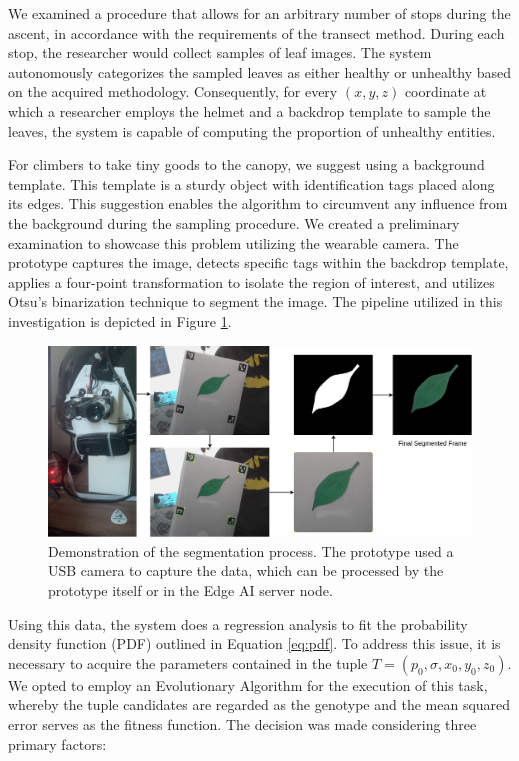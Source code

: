 We examined a procedure that allows for an arbitrary number of stops during the ascent, in accordance with the requirements of the transect method. During each stop, the researcher would collect samples of leaf images. The system autonomously categorizes the sampled leaves as either healthy or unhealthy based on the acquired methodology. Consequently, for every $(x,y,z)$ coordinate at which a researcher employs the helmet and a backdrop template to sample the leaves, the system is capable of computing the proportion of unhealthy entities. 

For climbers to take tiny goods to the canopy, we suggest using a background template. This template is a sturdy object with identification tags placed along its edges. This suggestion enables the algorithm to circumvent any influence from the background during the sampling procedure. We created a preliminary examination to showcase this problem utilizing the wearable camera. The prototype captures the image, detects specific tags within the backdrop template, applies a four-point transformation to isolate the region of interest, and utilizes Otsu's binarization technique to segment the image. The pipeline utilized in this investigation is depicted in Figure \ref{fig:segmentation}.

\begin{figure}[h!]
    \centering
    \includegraphics[width = .9\linewidth]{Figures/segmentation.png}
    \caption{Demonstration of the segmentation process. The prototype used a USB camera to capture the data, which can be processed by the prototype itself or in the Edge AI server node.}
    \label{fig:segmentation}
\end{figure}

Using this data, the system does a regression analysis to fit the probability density function (PDF) outlined in Equation \ref{eq:pdf}. To address this issue, it is necessary to acquire the parameters contained in the tuple $T = (p_0, \sigma, x_0, y_0, z_0)$. We opted to employ an Evolutionary Algorithm for the execution of this task, whereby the tuple candidates are regarded as the genotype and the mean squared error serves as the fitness function. {The decision was made considering three primary factors:}  

